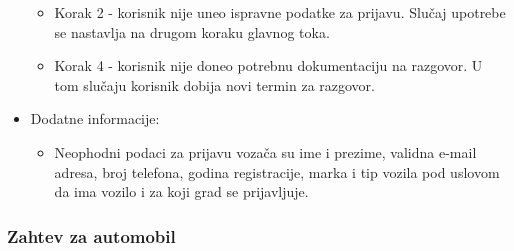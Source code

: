 \begin{itemize}
		\begin{itemize}
    		\item Korak 2 - korisnik nije uneo ispravne podatke za prijavu. Slučaj upotrebe se nastavlja na drugom koraku glavnog toka.
		    \item Korak 4 - korisnik nije doneo potrebnu dokumentaciju na razgovor. U tom slučaju korisnik dobija novi termin za razgovor.
		\end{itemize}
	\item Dodatne informacije:
		\begin{itemize}
			\item Neophodni podaci za prijavu vozača su ime i prezime, validna e-mail adresa, broj telefona, godina registracije, marka i tip vozila pod uslovom da ima vozilo i za koji grad se prijavljuje.
		\end{itemize}						
\end{itemize}


\subsubsection{\bfseries Zahtev za automobil}

